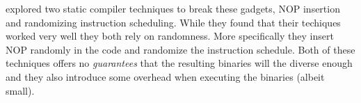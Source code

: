 \textcite{large-scale-automated} explored two static compiler techniques to break these
gadgets, NOP insertion and randomizing instruction scheduling. While they found that their
techiques worked very well they both rely on randomness. More specifically they insert
NOP randomly in the code and randomize the instruction schedule. Both of these techniques
offers no \textit{guarantees} that the resulting binaries will the diverse enough and they
also introduce some overhead when executing the binaries (albeit small).


